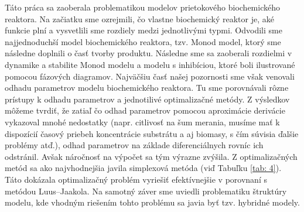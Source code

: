 Táto práca sa zaoberala problematikou modelov prietokového biochemického reaktora. Na začiatku sme ozrejmili, čo vlastne biochemický reaktor je, aké funkcie plní a vysvetlili sme rozdiely medzi jednotlivými typmi. Odvodili sme najjednoduchší model biochemického reaktora, tzv. Monod model, ktorý sme následne doplnili o časť tvorby produktu. Následne sme sa zaoberali rozdielmi v dynamike a stabilite Monod modelu a modelu s inhibíciou, ktoré boli ilustrované pomocou fázových diagramov. Najväčšiu časť našej pozornosti sme však venovali odhadu parametrov modelu biochemického reaktora. Tu sme porovnávali rôzne prístupy k odhadu parametrov a jednotilivé optimalizačné metódy. Z výsledkov môžeme tvrdiť, že zatiaľ čo odhad parametrov pomocou aproximácie derivácie vykazoval mnohé nedostatky (napr. citlivosť na šum merania, musíme mať k dispozícií časový priebeh koncentrácie substrátu a aj biomasy, s čím súvisia ďalšie problémy atď.), odhad parametrov na základe diferenciálnych rovníc ich odstránil. Avšak náročnosť na výpočet sa tým výrazne zvýšila. Z optimalizačných metód sa ako najvhodnejšia javila simplexová metóda (viď Tabuľku \ref{tab: 4}). Táto dokázala optimalizačný problém vyriešiť efektívnejšie v porovnaní s metódou Luus--Jaakola. Na samotný záver sme uviedli problematiku štruktúry modelu, kde vhodným riešením tohto problému sa javia byť tzv. hybridné modely. 